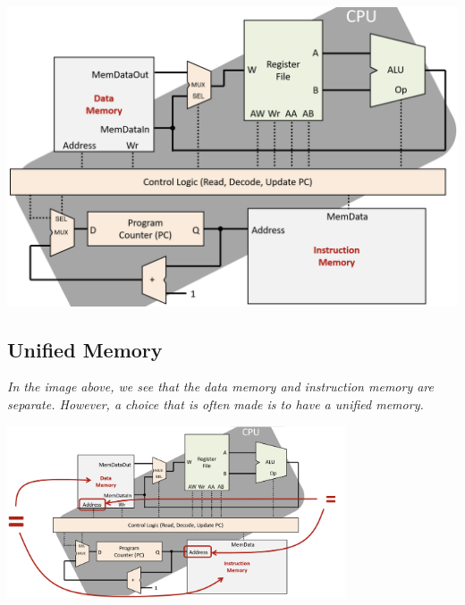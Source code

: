 \hfill
\vline
\hfill
\begin{minipage}[htp]{0.45\textwidth}
    \begin{center}
        \includegraphics[width=1.2\textwidth]{chapters/chapter2a/images/processor.png}
    \end{center}
\end{minipage}

\subsection{Unified Memory}
\textit{In the image above, we see that the data memory and instruction memory are separate. However, a choice that is often made is to have a unified memory.}
\begin{center}
    \includegraphics[width=0.75\textwidth]{chapters/chapter2a/images/unified.png}
\end{center}

